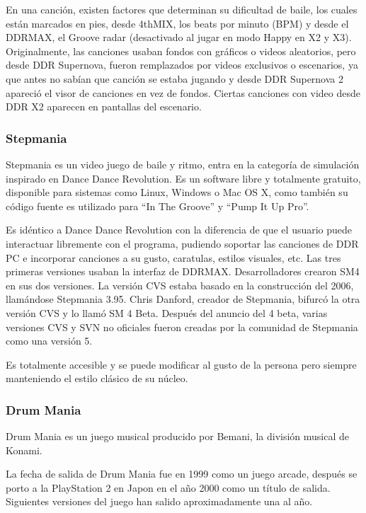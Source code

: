 \documentclass[a4paper,11pt,oneside]{book}
\begin{document}
En una canción, existen factores que determinan su dificultad de baile, los cuales están marcados en pies, desde 4thMIX, los beats por minuto (BPM) y desde el DDRMAX, el Groove radar (desactivado al jugar en modo Happy en X2 y X3). Originalmente, las canciones usaban fondos con gráficos o videos aleatorios, pero desde DDR Supernova, fueron remplazados por videos exclusivos o escenarios, ya que antes no sabían que canción se estaba jugando y desde DDR Supernova 2 apareció el visor de canciones en vez de fondos. Ciertas canciones con video desde DDR X2 aparecen en pantallas del escenario.

\subsubsection{Stepmania}

Stepmania es un video juego de baile y ritmo, entra en la categoría de simulación inspirado en Dance Dance Revolution. Es un software libre y totalmente gratuito, disponible para sistemas como Linux, Windows o Mac OS X, como también su código fuente es utilizado para ``In The Groove'' y ``Pump It Up Pro''.

Es idéntico a Dance Dance Revolution con la diferencia de que el usuario puede interactuar libremente con el programa, pudiendo soportar las canciones de DDR PC e incorporar canciones a su gusto, caratulas, estilos visuales, etc. Las tres primeras versiones usaban la interfaz de DDRMAX. Desarrolladores crearon SM4 en sus dos versiones. La versión CVS estaba basado en la construcción del 2006, llamándose Stepmania 3.95. Chris Danford, creador de Stepmania, bifurcó la otra versión CVS y lo llamó SM 4 Beta. Después del anuncio del 4 beta, varias versiones CVS y SVN no oficiales fueron creadas por la comunidad de Stepmania como una versión 5.

Es totalmente accesible y se puede modificar al gusto de la persona pero siempre manteniendo el estilo clásico de su núcleo.

\subsubsection{Drum Mania}
Drum Mania es un juego musical producido por Bemani, la división musical de Konami.

La fecha de salida de Drum Mania fue en 1999 como un juego arcade, después se porto a la PlayStation 2 en Japon en el año 2000 como un título de salida. Siguientes versiones del juego han salido aproximadamente una al año.
\end{document}
